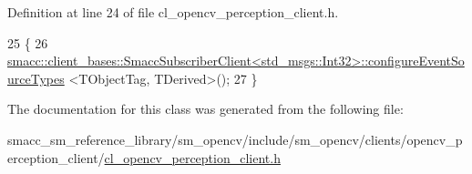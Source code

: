Definition at line 24 of file cl\+\_\+opencv\+\_\+perception\+\_\+client.\+h.


\begin{DoxyCode}
25   \{
26     
      \hyperlink{classsmacc_1_1client__bases_1_1SmaccSubscriberClient}{smacc::client\_bases::SmaccSubscriberClient<std\_msgs::Int32>::configureEventSourceTypes}
      <TObjectTag, TDerived>();
27   \}
\end{DoxyCode}


The documentation for this class was generated from the following file\+:\begin{DoxyCompactItemize}
\item 
smacc\+\_\+sm\+\_\+reference\+\_\+library/sm\+\_\+opencv/include/sm\+\_\+opencv/clients/opencv\+\_\+perception\+\_\+client/\hyperlink{cl__opencv__perception__client_8h}{cl\+\_\+opencv\+\_\+perception\+\_\+client.\+h}\end{DoxyCompactItemize}
